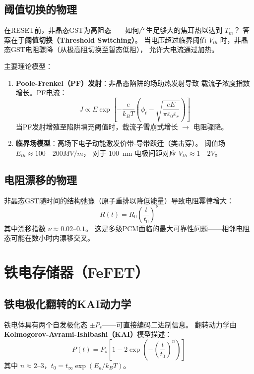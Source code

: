 \documentclass[11pt,a4paper,twoside]{article}
\theoremstyle{definition}\newtheorem{definition}{定义}[section]
\theoremstyle{plain}\newtheorem{theorem}{定理}[section]
\theoremstyle{remark}\newtheorem{remark}{注解}[section]
\begin{document}
\subsection{阈值切换的物理}

在RESET前，非晶态GST为高阻态——如何产生足够大的焦耳热以达到 $T_m$？
答案在于\textbf{阈值切换（Threshold Switching）}。
当电压超过临界阈值 $V_{th}$ 时，非晶态GST电阻骤降（从极高阻切换至暂态低阻），
允许大电流通过加热。

主要理论模型：
\begin{enumerate}
  \item \textbf{Poole-Frenkel（PF）发射}：非晶态陷阱的场助热发射导致
  载流子浓度指数增长。PF电流：
  \begin{equation}
    J \propto E \exp\!\left[ -\frac{e}{k_B T}
          \left( \phi_t - \sqrt{\frac{eE}{\pi\varepsilon_0\varepsilon_r}} \right) \right]
  \end{equation}
  当PF发射增殖至陷阱填充阈值时，载流子雪崩式增长 $\to$ 电阻骤降。

  \item \textbf{临界场模型}：高场下电子动能激发价带-导带跃迁（类击穿）。
  阈值场 $E_{th} \approx \SI{100}{-200}{MV/m}$，
  对于 \SI{100}{nm} 电极间距对应 $V_{th} \approx \SI{1}{-2}{V}$。
\end{enumerate}

\subsection{电阻漂移的物理}

非晶态GST随时间的结构弛豫（原子重排以降低能量）导致电阻幂律增大：
\begin{equation}\label{eq:drift}
  R(t) = R_0 \left( \frac{t}{t_0} \right)^\nu
\end{equation}
其中漂移指数 $\nu \approx 0.02$--$0.1$。
这是多级PCM面临的最大可靠性问题——相邻电阻态可能在数小时内漂移交叉。

\section{铁电存储器（FeFET）}
\label{sec:ferroelectric}

\subsection{铁电极化翻转的KAI动力学}

铁电体具有两个自发极化态 $\pm P_s$——可直接编码二进制信息。
翻转动力学由\textbf{Kolmogorov-Avrami-Ishibashi（KAI）}模型描述：
\begin{equation}\label{eq:kai}
  P(t) = P_s \left[ 1 - 2 \exp\!\left( -\left( \frac{t}{t_0} \right)^n \right) \right]
\end{equation}
其中 $n \approx 2$--$3$，$t_0 = t_\infty \exp(E_a/k_B T)$。
\end{document}

